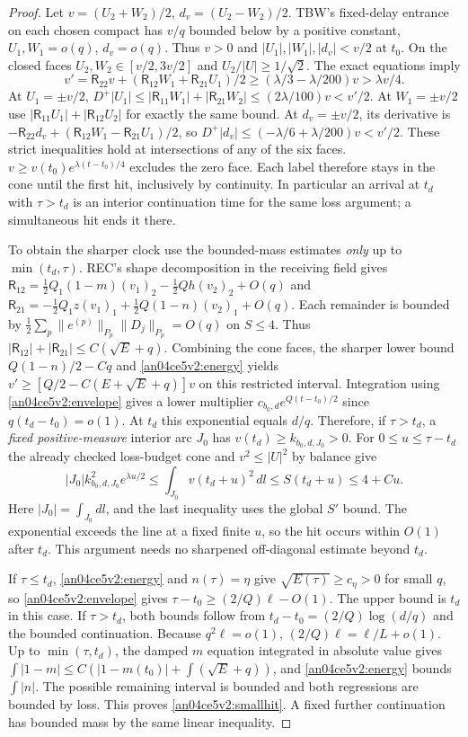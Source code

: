 \documentclass[11pt]{article}
\newcommand{\dd}{\,dl}
\begin{document}
\begin{proof}
Let $v=(U_2+W_2)/2$, $d_v=(U_2-W_2)/2$. TBW's fixed-delay entrance on each chosen compact has $v/q$ bounded below by a positive constant, $U_1,W_1=o(q)$, $d_v=o(q)$. Thus $v>0$ and $|U_1|,|W_1|,|d_v|<v/2$ at $t_0$. On the closed faces $U_2,W_2\in[v/2,3v/2]$ and $U_2/|U|\ge1/\sqrt2$. The exact equations imply
\[
 v'=\mathsf R_{22}v+(\mathsf R_{12}W_1+\mathsf R_{21}U_1)/2
 \ge(\lambda/3-\lambda/200)v>\lambda v/4 .
\]
At $U_1=\pm v/2$, $D^+|U_1|\le |\mathsf R_{11}W_1|+|\mathsf R_{21}W_2|\le(2\lambda/100)v<v'/2$. At $W_1=\pm v/2$ use $|\mathsf R_{11}U_1|+|\mathsf R_{12}U_2|$ for exactly the same bound. At $d_v=\pm v/2$, its derivative is $-\mathsf R_{22}d_v+(\mathsf R_{12}W_1-\mathsf R_{21}U_1)/2$, so $D^+|d_v|\le(-\lambda/6+\lambda/200)v<v'/2$. These strict inequalities hold at intersections of any of the six faces. $v\ge v(t_0)e^{\lambda(t-t_0)/4}$ excludes the zero face. Each label therefore stays in the cone until the first hit, inclusively by continuity. In particular an arrival at $t_d$ with $\tau>t_d$ is an interior continuation time for the same loss argument; a simultaneous hit ends it there.

To obtain the sharper clock use the bounded-mass estimates \emph{only} up to $\min(t_d,\tau)$. REC's shape decomposition in the receiving field gives
$\mathsf R_{12}=\tfrac12Q_1(1-m)(v_1)_2-\tfrac12 Q h(v_2)_2+O(q)$ and
$\mathsf R_{21}=-\tfrac12Q_1 z(v_1)_1+\tfrac12Q(1-n)(v_2)_1+O(q)$.
Each remainder is bounded by $\frac12\sum_p\|e^{(p)}\|_{P_p}\|D_j\|_{P_p}=O(q)$ on $S\le4$. Thus $|\mathsf R_{12}|+|\mathsf R_{21}|\le C(\sqrt E+q)$. Combining the cone faces, the sharper lower bound $Q(1-n)/2-Cq$ and \eqref{an04ce5v2:energy} yields
$v'\ge[Q/2-C(E+\sqrt E+q)]v$ on this restricted interval. Integration using \eqref{an04ce5v2:envelope} gives a lower multiplier $c_{b_0,d}e^{Q(t-t_0)/2}$ since $q(t_d-t_0)=o(1)$. At $t_d$ this exponential equals $d/q$. Therefore, if $\tau>t_d$, a \emph{fixed positive-measure} interior arc $J_0$ has $v(t_d)\ge k_{b_0,d,J_0}>0$. For $0\le u\le\tau-t_d$ the already checked loss-budget cone and $v^2\le |U|^2$ by balance give
\[
 |J_0|k_{b_0,d,J_0}^2 e^{\lambda u/2}
 \le\int_{J_0}v(t_d+u)^2\dd\le S(t_d+u)\le4+Cu .
\]
Here $|J_0|=\int_{J_0}dl$, and the last inequality uses the global $S'$ bound. The exponential exceeds the line at a fixed finite $u$, so the hit occurs within $O(1)$ after $t_d$. This argument needs no sharpened off-diagonal estimate beyond $t_d$.

If $\tau\le t_d$, \eqref{an04ce5v2:energy} and $n(\tau)=\eta$ give $\sqrt{E(\tau)}\ge c_\eta>0$ for small $q$, so \eqref{an04ce5v2:envelope} gives $\tau-t_0\ge(2/Q)\ell-O(1)$. The upper bound is $t_d$ in this case. If $\tau>t_d$, both bounds follow from $t_d-t_0=(2/Q)\log(d/q)$ and the bounded continuation. Because $q^2\ell=o(1)$, $(2/Q)\ell=\ell/L+o(1)$. Up to $\min(\tau,t_d)$, the damped $m$ equation integrated in absolute value gives $\int |1-m|\le C(|1-m(t_0)|+\int(\sqrt E+q))$, and \eqref{an04ce5v2:energy} bounds $\int |n|$. The possible remaining interval is bounded and both regressions are bounded by loss. This proves \eqref{an04ce5v2:smallhit}. A fixed further continuation has bounded mass by the same linear inequality.
\end{proof}
\end{document}
